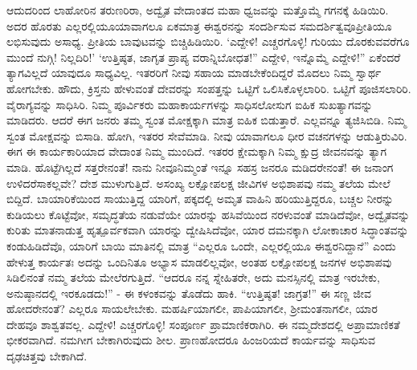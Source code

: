 ಆದುದರಿಂದ ಲಾಹೋರಿನ ತರುಣರಿರಾ, ಅದ್ವೈತ ವೇದಾಂತದ ಮಹಾ ಧ್ವಜವನ್ನು ಮತ್ತೊಮ್ಮೆ ಗಗನಕ್ಕೆ ಹಿಡಿಯಿರಿ. ಅದರ ಹೊರತು ಎಲ್ಲರಲ್ಲಿಯೂ\break ಯಾವಾಗಲೂ ಏಕಮಾತ್ರ ಈಶ್ವರನನ್ನು ಸಂದರ್ಶಿಸುವ ಸಮದರ್ಶಿತ್ವವೂ\break ಪ್ರೀತಿಯೂ ಲಭಿಸುವುದು ಅಸಾಧ್ಯ. ಪ್ರೀತಿಯ ಬಾವುಟವನ್ನು ಬಿಚ್ಚಿಹಿಡಿಯಿರಿ. ‘ಎದ್ದೇಳಿ! ಎಚ್ಚರಗೊಳ್ಳಿ! ಗುರಿಯು ದೊರಕುವವರೆಗೂ ಮುಂದೆ ನುಗ್ಗಿ! ನಿಲ್ಲದಿರಿ!’ ‘ಉತ್ತಿಷ್ಠತ, ಜಾಗೃತ ಪ್ರಾಪ್ಯ ವರಾನ್ನಿಬೋಧತ!” ಎದ್ದೇಳಿ, ಇನ್ನೊಮ್ಮೆ ಎದ್ದೇಳಿ!” ಏಕೆಂದರೆ ತ್ಯಾಗವಿಲ್ಲದೆ ಯಾವುದೂ ಸಾಧ್ಯವಿಲ್ಲ. ಇತರರಿಗೆ ನೀವು ಸಹಾಯ ಮಾಡಬೇಕೆಂದಿದ್ದರೆ ಮೊದಲು ನಿಮ್ಮ ಸ್ವಾರ್ಥ ಹೋಗಬೇಕು. ಹೌದು, ಕ್ರಿಸ್ತನು ಹೇಳುವಂತೆ ದೇವರನ್ನು ಸಂಪತ್ತನ್ನು ಒಟ್ಟಿಗೆ ಒಲಿಸಿಕೊಳ್ಳಲಾರಿರಿ. ಒಟ್ಟಿಗೆ ಪೂಜಿಸಲಾರಿರಿ. ವೈರಾಗ್ಯವನ್ನು ಸಾಧಿಸಿರಿ. ನಿಮ್ಮ ಪೂರ್ವಿಕರು ಮಹಾಕಾರ್ಯಗಳನ್ನು ಸಾಧಿಸಲೋಸುಗ ಐಹಿಕ ಸುಖತ್ಯಾಗವನ್ನು ಮಾಡಿದರು. ಆದರೆ ಈಗ ಜನರು ತಮ್ಮ ಸ್ವಂತ ಮೋಕ್ಷಕ್ಕಾಗಿ ಮಾತ್ರ ಐಹಿಕ ಬಿಡುತ್ತಾರೆ. ಎಲ್ಲವನ್ನೂ ತ್ಯಜಿಸಿಬಿಡಿ. ನಿಮ್ಮ ಸ್ವಂತ ಮೋಕ್ಷವನ್ನು ಬಿಸಾಡಿ. ಹೋಗಿ, ಇತರರ ಸೇವೆಮಾಡಿ. ನೀವು ಯಾವಾಗಲೂ ಧೀರ ವಚನಗಳನ್ನು ಆಡುತ್ತಿರುವಿರಿ. ಈಗ ಈ ಕಾರ್ಯಕಾರಿಯಾದ ವೇದಾಂತ ನಿಮ್ಮ ಮುಂದಿದೆ. ಇತರರ ಕ್ಷೇಮಕ್ಕಾಗಿ ನಿಮ್ಮ ಕ್ಷುದ್ರ ಜೀವನವನ್ನು ತ್ಯಾಗ ಮಾಡಿ. ಹೊಟ್ಟೆಗಿಲ್ಲದೆ ಸತ್ತರೇನಂತೆ! ನಾನು ನೀವೂ\break ನಿಮ್ಮಂತೆ ಇನ್ನೂ ಸಹಸ್ರ ಜನರೂ ಮಡಿದರೇನಂತೆ! ಈ ಜನಾಂಗ ಉಳಿದರೆ\break ಸಾಕಲ್ಲವೇ? ದೇಶ ಮುಳುಗುತ್ತಿದೆ. ಅಸಂಖ್ಯ ಲಕ್ಷೋಪಲಕ್ಷ ಜೀವಿಗಳ ಅಭಿಶಾಪವು ನಮ್ಮ ತಲೆಯ ಮೇಲೆ ಬಿದ್ದಿದೆ. ಬಾಯಾರಿಕೆಯಿಂದ ಸಾಯುತ್ತಿದ್ದ ಯಾರಿಗೆ, ಪಕ್ಕದಲ್ಲಿ ಅಮೃತ ವಾಹಿನಿ ಹರಿಯುತ್ತಿದ್ದರೂ, ಬಚ್ಚಲ ನೀರನ್ನು ಕುಡಿಯಲು ಕೊಟ್ಟೆವೋ, ಸಮೃದ್ಧತೆಯ ನಡುವೆಯೇ ಯಾರನ್ನು ಹಸಿವೆಯಿಂದ ನರಳುವಂತೆ ಮಾಡಿದೆವೋ, ಅದ್ವೈತವನ್ನು ಕುರಿತು ಮಾತನಾಡುತ್ತ ಹೃತ್ಪೂರ್ವಕವಾಗಿ ಯಾರನ್ನು ದ್ವೇಷಿಸಿದೆವೋ, ಯಾರ ದಮನಕ್ಕಾಗಿ ಲೋಕಾಚಾರ ಸಿದ್ಧಾಂತವನ್ನು ಕಂಡುಹಿಡಿದೆವೊ, ಯಾರಿಗೆ ಬಾಯಿ ಮಾತಿನಲ್ಲಿ ಮಾತ್ರ “ಎಲ್ಲರೂ ಒಂದೇ, ಎಲ್ಲರಲ್ಲಿಯೂ ಈಶ್ವರನಿದ್ದಾನೆ” ಎಂದು ಹೇಳುತ್ತ ಕಾರ್ಯತಃ ಅದನ್ನು ಒಂದಿನಿತೂ ಅಭ್ಯಾಸ ಮಾಡಲಿಲ್ಲವೋ, ಅಂತಹ ಲಕ್ಷೋಪಲಕ್ಷ ಜನಗಳ ಅಭಿಶಾಪವು ಸಿಡಿಲಿನಂತೆ ನಮ್ಮ ತಲೆಯ ಮೇಲೆರಗುತ್ತಿದೆ. “ಆದರೂ ನನ್ನ ಸ್ನೇಹಿತರೇ, ಅದು ಮನಸ್ಸಿನಲ್ಲಿ ಮಾತ್ರ ಇರಬೇಕು, ಅನುಷ್ಠಾನದಲ್ಲಿ ಇರಕೂಡದು!” - ಈ ಕಳಂಕವನ್ನು ತೊಡೆದು ಹಾಕಿ. “ಉತ್ತಿಷ್ಠತ! ಜಾಗ್ರತ!” ಈ ಸಣ್ಣ ಜೀವ ಹೋದರೇನಂತೆ? ಎಲ್ಲರೂ ಸಾಯಲೇಬೇಕು. ಮಹರ್ಷಿಯಾಗಲೀ, ಪಾಪಿಯಾಗಲೀ, ಶ‍್ರೀಮಂತನಾಗಲೀ, ಯಾರ ದೇಹವೂ ಶಾಶ್ವತವಲ್ಲ. ಎದ್ದೇಳಿ! ಎಚ್ಚರಗೊಳ್ಳಿ! ಸಂಪೂರ್ಣ ಪ್ರಾಮಾಣಿಕರಾಗಿರಿ. ಈ ನಮ್ಮ\break ದೇಶದಲ್ಲಿ ಅಪ್ರಾಮಾಣಿಕತೆ ಭೀಕರವಾಗಿದೆ. ನಮಗೀಗ ಬೇಕಾಗಿರುವುದು ಶೀಲ. ಪ್ರಾಣಹೋದರೂ ಹಿಂಜರಿಯದೆ ಕಾರ್ಯವನ್ನು ಸಾಧಿಸುವ ದೃಢಚಿತ್ತವು ಬೇಕಾಗಿದೆ.

